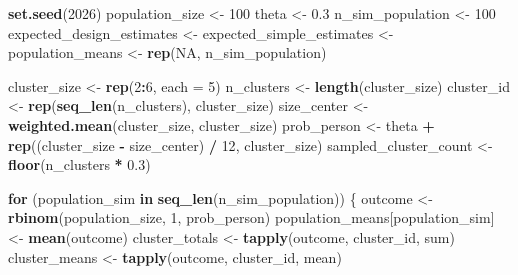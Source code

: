 \documentclass[
  spanish,
  12pt,
]{book}
\newenvironment{Shaded}{\begin{snugshade}}{\end{snugshade}}
\newcommand{\AttributeTok}[1]{\textcolor[rgb]{0.13,0.29,0.53}{#1}}
\newcommand{\ConstantTok}[1]{\textcolor[rgb]{0.56,0.35,0.01}{#1}}
\newcommand{\ControlFlowTok}[1]{\textcolor[rgb]{0.13,0.29,0.53}{\textbf{#1}}}
\newcommand{\DecValTok}[1]{\textcolor[rgb]{0.00,0.00,0.81}{#1}}
\newcommand{\FloatTok}[1]{\textcolor[rgb]{0.00,0.00,0.81}{#1}}
\newcommand{\FunctionTok}[1]{\textcolor[rgb]{0.13,0.29,0.53}{\textbf{#1}}}
\newcommand{\NormalTok}[1]{#1}
\newcommand{\OtherTok}[1]{\textcolor[rgb]{0.56,0.35,0.01}{#1}}
\newcommand{\SpecialCharTok}[1]{\textcolor[rgb]{0.81,0.36,0.00}{\textbf{#1}}}
\begin{document}
\begin{Shaded}
\begin{Highlighting}[]
\FunctionTok{set.seed}\NormalTok{(}\DecValTok{2026}\NormalTok{)}
\NormalTok{population\_size }\OtherTok{\textless{}{-}} \DecValTok{100}
\NormalTok{theta }\OtherTok{\textless{}{-}} \FloatTok{0.3}
\NormalTok{n\_sim\_population }\OtherTok{\textless{}{-}} \DecValTok{100}
\NormalTok{expected\_design\_estimates }\OtherTok{\textless{}{-}}\NormalTok{ expected\_simple\_estimates }\OtherTok{\textless{}{-}}\NormalTok{ population\_means }\OtherTok{\textless{}{-}}
  \FunctionTok{rep}\NormalTok{(}\ConstantTok{NA}\NormalTok{, n\_sim\_population)}

\NormalTok{cluster\_size }\OtherTok{\textless{}{-}} \FunctionTok{rep}\NormalTok{(}\DecValTok{2}\SpecialCharTok{:}\DecValTok{6}\NormalTok{, }\AttributeTok{each =} \DecValTok{5}\NormalTok{)}
\NormalTok{n\_clusters }\OtherTok{\textless{}{-}} \FunctionTok{length}\NormalTok{(cluster\_size)}
\NormalTok{cluster\_id }\OtherTok{\textless{}{-}} \FunctionTok{rep}\NormalTok{(}\FunctionTok{seq\_len}\NormalTok{(n\_clusters), cluster\_size)}
\NormalTok{size\_center }\OtherTok{\textless{}{-}} \FunctionTok{weighted.mean}\NormalTok{(cluster\_size, cluster\_size)}
\NormalTok{prob\_person }\OtherTok{\textless{}{-}}\NormalTok{ theta }\SpecialCharTok{+} \FunctionTok{rep}\NormalTok{((cluster\_size }\SpecialCharTok{{-}}\NormalTok{ size\_center) }\SpecialCharTok{/} \DecValTok{12}\NormalTok{, cluster\_size)}
\NormalTok{sampled\_cluster\_count }\OtherTok{\textless{}{-}} \FunctionTok{floor}\NormalTok{(n\_clusters }\SpecialCharTok{*} \FloatTok{0.3}\NormalTok{)}

\ControlFlowTok{for}\NormalTok{ (population\_sim }\ControlFlowTok{in} \FunctionTok{seq\_len}\NormalTok{(n\_sim\_population)) \{}
\NormalTok{  outcome }\OtherTok{\textless{}{-}} \FunctionTok{rbinom}\NormalTok{(population\_size, }\DecValTok{1}\NormalTok{, prob\_person)}
\NormalTok{  population\_means[population\_sim] }\OtherTok{\textless{}{-}} \FunctionTok{mean}\NormalTok{(outcome)}
\NormalTok{  cluster\_totals }\OtherTok{\textless{}{-}} \FunctionTok{tapply}\NormalTok{(outcome, cluster\_id, sum)}
\NormalTok{  cluster\_means }\OtherTok{\textless{}{-}} \FunctionTok{tapply}\NormalTok{(outcome, cluster\_id, mean)}


\end{Highlighting}
\end{Shaded}
\end{document}
